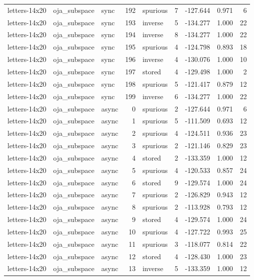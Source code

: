 \begin{tabular}{lllrlrrrr}
letters-14x20 & oja\_subspace & sync & 192 & spurious & 7 & -127.644 & 0.971 & 6 \\
letters-14x20 & oja\_subspace & sync & 193 & inverse & 5 & -134.277 & 1.000 & 22 \\
letters-14x20 & oja\_subspace & sync & 194 & inverse & 8 & -134.277 & 1.000 & 22 \\
letters-14x20 & oja\_subspace & sync & 195 & spurious & 4 & -124.798 & 0.893 & 18 \\
letters-14x20 & oja\_subspace & sync & 196 & inverse & 4 & -130.076 & 1.000 & 10 \\
letters-14x20 & oja\_subspace & sync & 197 & stored & 4 & -129.498 & 1.000 & 2 \\
letters-14x20 & oja\_subspace & sync & 198 & spurious & 5 & -121.417 & 0.879 & 12 \\
letters-14x20 & oja\_subspace & sync & 199 & inverse & 6 & -134.277 & 1.000 & 22 \\
letters-14x20 & oja\_subspace & async & 0 & spurious & 2 & -127.644 & 0.971 & 6 \\
letters-14x20 & oja\_subspace & async & 1 & spurious & 5 & -111.509 & 0.693 & 12 \\
letters-14x20 & oja\_subspace & async & 2 & spurious & 4 & -124.511 & 0.936 & 23 \\
letters-14x20 & oja\_subspace & async & 3 & spurious & 2 & -121.146 & 0.829 & 23 \\
letters-14x20 & oja\_subspace & async & 4 & stored & 2 & -133.359 & 1.000 & 12 \\
letters-14x20 & oja\_subspace & async & 5 & spurious & 4 & -120.533 & 0.857 & 24 \\
letters-14x20 & oja\_subspace & async & 6 & stored & 9 & -129.574 & 1.000 & 24 \\
letters-14x20 & oja\_subspace & async & 7 & spurious & 2 & -126.829 & 0.943 & 12 \\
letters-14x20 & oja\_subspace & async & 8 & spurious & 2 & -113.928 & 0.793 & 12 \\
letters-14x20 & oja\_subspace & async & 9 & stored & 4 & -129.574 & 1.000 & 24 \\
letters-14x20 & oja\_subspace & async & 10 & spurious & 4 & -127.722 & 0.993 & 25 \\
letters-14x20 & oja\_subspace & async & 11 & spurious & 3 & -118.077 & 0.814 & 22 \\
letters-14x20 & oja\_subspace & async & 12 & stored & 4 & -128.430 & 1.000 & 23 \\
letters-14x20 & oja\_subspace & async & 13 & inverse & 5 & -133.359 & 1.000 & 12 \\

\end{tabular}
